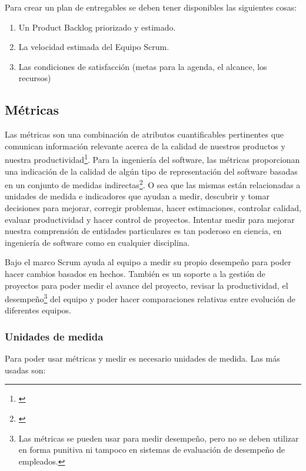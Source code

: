 Para crear un plan de entregables se deben tener disponibles las siguientes cosas:

\begin{enumerate}
\item Un Product Backlog priorizado y estimado.
\item La velocidad estimada del Equipo Scrum.
\item Las condiciones de satisfacción (metas para la agenda, el alcance, los recursos)
\end{enumerate}

\subsection{Métricas}

Las métricas son una combinación de atributos cuantificables pertinentes que comunican información relevante acerca de la calidad de nuestros productos y nuestra productividad\footnote{\cite{INCOSE-2005}}. Para la ingeniería del software, las métricas proporcionan una indicación de la calidad de algún tipo de representación del software basadas en un conjunto de medidas indirectas\footnote{\cite{Roger-Pressman-2002}}. O sea que las mismas están relacionadas a unidades de medida e indicadores que ayudan a medir, descubrir y tomar decisiones para mejorar, corregir problemas, hacer estimaciones, controlar calidad, evaluar productividad y hacer control de proyectos. Intentar medir para mejorar nuestra comprensión de entidades particulares es tan poderoso en ciencia, en ingeniería de software como en cualquier disciplina.

Bajo el marco Scrum ayuda al equipo a medir su propio desempeño para poder hacer cambios basados en hechos. También es un soporte a la gestión de proyectos para poder medir el avance del proyecto, revisar la productividad, el desempeño\footnote{Las métricas se pueden usar para medir desempeño, pero no se deben utilizar en forma punitiva ni tampoco en sistemas de evaluación de desempeño de empleados.} del equipo y poder hacer comparaciones relativas entre evolución de diferentes equipos. 

\subsubsection{Unidades de medida}

Para poder usar métricas y medir es necesario unidades de medida. Las más usadas son:

